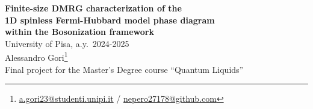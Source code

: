 \documentclass[a4paper]{article}
\begin{document}
\begin{center}
    {\bfseries {\Large Finite-size DMRG characterization of the}} \\[0.8em]
    {\bfseries {\Large 1D spinless Fermi-Hubbard model phase diagram}}\\[0.8em]
    {\bfseries {\Large within the Bosonization framework}} \\[1em]
    \large University of Pisa, a.y.~2024-2025 \\[0.8em]
    Alessandro Gori\footnote{\href{mailto:a.gori23@studenti.unipi.it}{a.gori23@studenti.unipi.it} / \href{https://github.com/nepero27178}{nepero27178@github.com}} \\[0.8em]
    \scriptsize Final project for the Master's Degree course ``Quantum Liquids''
    
\end{center}

\renewcommand*{\thefootnote}{\arabic{footnote}}
\setcounter{footnote}{0}
\end{document}

